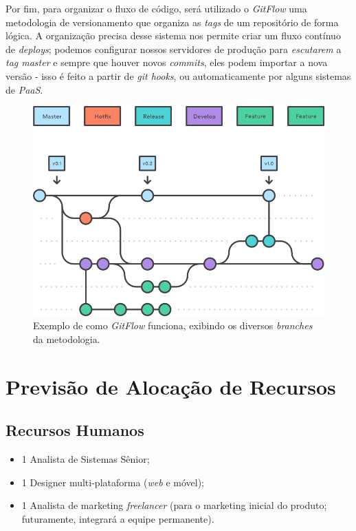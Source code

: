 \documentclass[a4paper]{abnt}
\begin{document}
Por fim, para organizar o fluxo de código, será utilizado o \emph{GitFlow}\cite{gitflow} uma metodologia de versionamento que organiza as \emph{tags} de um repositório de forma lógica. A organização precisa desse sistema nos permite criar um fluxo contínuo de \emph{deploys}; podemos configurar nossos servidores de produção para \emph{escutarem} a \emph{tag master} e sempre que houver novos \emph{commits}, eles podem importar a nova versão - isso é feito a partir de \emph{git hooks}, ou automaticamente por alguns sistemas de \emph{PaaS}.

\begin{figure}
	\includegraphics[scale=0.65]{img/gitflow.png}
	\caption{Exemplo de como \emph{GitFlow} funciona, exibindo os diversos \emph{branches} da metodologia.}
\end{figure}

\section{Previsão de Alocação de Recursos}

\subsection*{Recursos Humanos}
\begin{itemize}
	\item 1 Analista de Sistemas Sênior;
	\item 1 Designer multi-plataforma (\textit{web} e m\'ovel);\footnotemark
	\item 1 Analista de marketing \emph{freelancer} (para o marketing inicial do produto; futuramente, integrará a equipe permanente).
\end{itemize}
\end{document}
